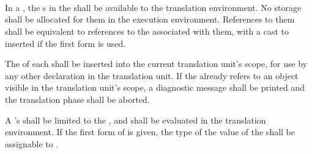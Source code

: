 
\begin{grammar}
 \\
	  \\

 \\
	 \optional{\terminal{,}} \\
	 \terminal{,}  \\

 \\
	 \terminal{:}  \terminal{=}  \\
	 \terminal{=}  \\
\end{grammar}

\specsubsubitem
In a , the s in the
 shall be available to the translation
environment. No storage shall be allocated for them in the execution
environment. References to them shall be equivalent to references to the
 associated with them, with a cast to 
inserted if the first form is used.


\specsubsubitem
The  of each  shall be
inserted into the current translation unit's scope, for use by any other
declaration in the translation unit. If the  already
refers to an object visible in the translation unit's scope, a diagnostic
message shall be printed and the translation phase shall be aborted.

\specsubsubitem
A 's  shall be limited to
the , and shall be evaluated
in the translation environment. If the first form of
 is given, the type of the value of the
 shall be assignable to .


